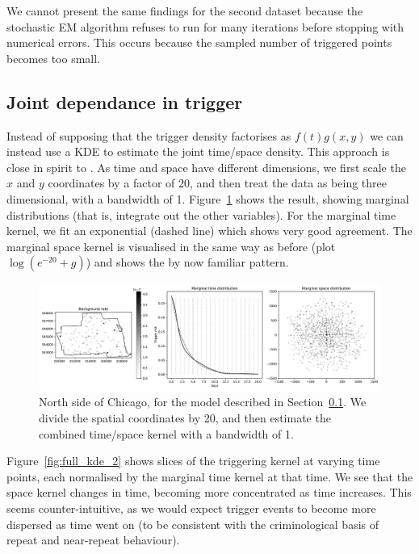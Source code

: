 \documentclass[twoside,a4paper]{article}
\theoremstyle{plain}
\theoremstyle{definition}
\begin{document}
We cannot present the same findings for the second dataset because the stochastic EM algorithm
refuses to run for many iterations before stopping with numerical errors.  This occurs because
the sampled number of triggered points becomes too small.




\subsection{Joint dependance in trigger}\label{sec:joint_grid}

Instead of supposing that the trigger density factorises as $f(t)g(x,y)$ we can instead use a KDE
to estimate the joint time/space density.  This approach is close in spirit to \cite{sepp}.
As time and space have different dimensions, we first scale the $x$ and $y$ coordinates by a factor
of 20, and then treat the data as being three dimensional, with a bandwidth of 1.
Figure~\ref{fig:full_kde_1} shows the result, showing marginal distributions (that is, integrate
out the other variables).  For the marginal time kernel, we fit an exponential (dashed line)
which shows very good agreement.  The marginal space kernel is visualised in the same way as
before (plot $\log(e^{-20}+g)$) and shows the by now familiar pattern.

\begin{figure}
  \includegraphics[width=\textwidth]{../notebooks/full_kde_1.pdf}
  \caption{North side of Chicago, for the model described in Section~\ref{sec:joint_grid}.
  We divide the spatial coordinates by 20, and then estimate the combined time/space kernel
  with a bandwidth of 1.}
  \label{fig:full_kde_1}
\end{figure}

Figure~\ref{fig:full_kde_2} shows slices of the triggering kernel at varying time points,
each normalised by the marginal time kernel at that time.  We see that the space kernel changes
in time, becoming more concentrated as time increases.  This seems counter-intuitive, as we would
expect trigger events to become more dispersed as time went on (to be consistent with the
criminological basis of repeat and near-repeat behaviour).
\end{document}

